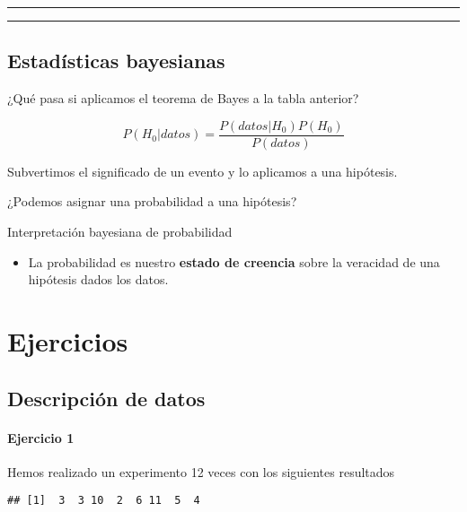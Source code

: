 \documentclass[
]{book}
\providecommand{\tightlist}{%
  \setlength{\itemsep}{0pt}\setlength{\parskip}{0pt}}
\begin{document}
\begin{center}\rule{0.5\linewidth}{0.5pt}\end{center}

\begin{center}\rule{0.5\linewidth}{0.5pt}\end{center}

\hypertarget{estaduxedsticas-bayesianas}{%
\section{Estadísticas bayesianas}\label{estaduxedsticas-bayesianas}}

¿Qué pasa si aplicamos el teorema de Bayes a la tabla anterior?

\[P(H_0|datos)=\frac{P(datos|H_0)P(H_0)}{P(datos)}\]

Subvertimos el significado de un evento y lo aplicamos a una hipótesis.

¿Podemos asignar una probabilidad a una hipótesis?

Interpretación bayesiana de probabilidad

\begin{itemize}
\tightlist
\item
  La probabilidad es nuestro \textbf{estado de creencia} sobre la veracidad de una hipótesis dados los datos.
\end{itemize}

\hypertarget{ejercicios}{%
\chapter{Ejercicios}\label{ejercicios}}

\hypertarget{descripciuxf3n-de-datos-1}{%
\section{Descripción de datos}\label{descripciuxf3n-de-datos-1}}

\hypertarget{ejercicio-1}{%
\subsubsection{Ejercicio 1}\label{ejercicio-1}}

Hemos realizado un experimento 12 veces con los siguientes resultados

\begin{verbatim}
## [1]  3  3 10  2  6 11  5  4
\end{verbatim}
\end{document}
